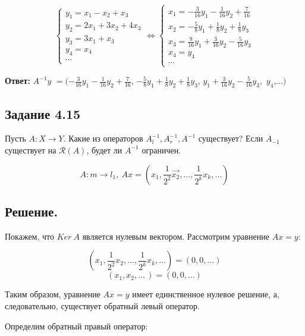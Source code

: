\documentclass[a4paper, 12pt]{report}
\begin{document}
\begin{equation*}
    \begin{cases}
        y_1 = x_1 - x_2 + x_3\\
        y_2 = 2 x_1 + 3 x_2 + 4 x_3\\
        y_3 = 3 x_1 + x_3\\
        y_4 = x_4\\
        \cdots 
    \end{cases}
    \Leftrightarrow
    \begin{cases}
        x_1 = - \frac{3}{16} y_1 - \frac{1}{16} y_2 + \frac{7}{16}\\
        x_2 = - \frac{5}{8} y_1 + \frac{1}{8} y_2 + \frac{1}{8} y_3\\
        x_3 = \frac{9}{16} y_1 + \frac{3}{16} y_2 - \frac{5}{16} y_3\\
        x_4 = y_4\\
        \cdots
    \end{cases}
\end{equation*}

\textbf{ Ответ: }$ A^{-1} y$ $= 
(- \frac{3}{16} y_1 - \frac{1}{16} y_2 + \frac{7}{16}$,
$- \frac{5}{8} y_1 + \frac{1}{8} y_2 + \frac{1}{8} y_3$,
$ y_1 + \frac{3}{16} y_2 - \frac{5}{16} y_3,$
$ y_4$,$ \dots)$

\subsection*{Задание 4.15}
Пусть $A: X \to Y$. Какие из операторов $A_l^{-1}, A_r^{-1}, A^{-1}$ существует? Если $A_{-1}$
существует на $\mathscr{R}(A)$, будет ли $A^{-1}$ ограничен.

\[A:m\to l_1,\ A x = \left( x_1, \frac{1}{2^2}\vec{x_2},\dots, 
\frac{1}{2^k} x_k, \dots \right)\]

\subsection*{Решение.}

Покажем, что $Ker\ A$ является нулевым вектором. Рассмотрим уравнение $A x = y$:

\[\left( x_1, \frac{1}{2^2} x_2, \dots , \frac{1}{2^k} x_k, \dots \right) = 
\left( 0, 0, \dots  \right)\]
\[( x_1, x_2, \dots\, ) = (0, 0, \dots )\]

Таким образом, уравнение $A x = y$ имеет единственное нулевое решение, а, следовательно,
существует обратный левый оператор.

Определим обратный правый оператор:
\end{document}
